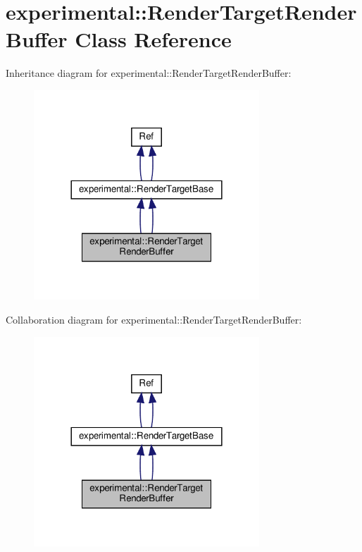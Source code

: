 \hypertarget{classexperimental_1_1RenderTargetRenderBuffer}{}\section{experimental\+:\+:Render\+Target\+Render\+Buffer Class Reference}
\label{classexperimental_1_1RenderTargetRenderBuffer}


Inheritance diagram for experimental\+:\+:Render\+Target\+Render\+Buffer\+:
\nopagebreak
\begin{figure}[H]
\begin{center}
\leavevmode
\includegraphics[width=240pt]{classexperimental_1_1RenderTargetRenderBuffer__inherit__graph}
\end{center}
\end{figure}


Collaboration diagram for experimental\+:\+:Render\+Target\+Render\+Buffer\+:
\nopagebreak
\begin{figure}[H]
\begin{center}
\leavevmode
\includegraphics[width=240pt]{classexperimental_1_1RenderTargetRenderBuffer__coll__graph}
\end{center}
\end{figure}
